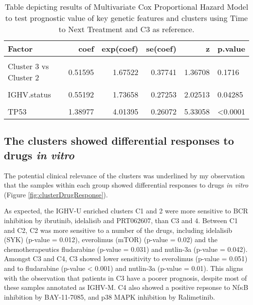 \documentclass[11pt, a4paper, twosided]{book}
\begin{document}
\begin{table}

\caption{\label{tab:clusterCox}Table depicting results of Multivariate Cox Proportional Hazard Model to test prognostic value of key genetic features and clusters using Time to Next Treatment and C3 as reference. }
\centering
\begin{tabular}[t]{l|r|r|r|r|l}
\hline
Factor & coef & exp(coef) & se(coef) & z & p.value\\
\hline
\cellcolor[HTML]{E2E868}{Cluster 3 vs Cluster 1} & \cellcolor[HTML]{E2E868}{-0.03979} & \cellcolor[HTML]{E2E868}{0.96099} & \cellcolor[HTML]{E2E868}{0.29813} & \cellcolor[HTML]{E2E868}{-0.13347} & \cellcolor[HTML]{E2E868}{0.89382}\\
\hline
Cluster 3 vs Cluster 2 & 0.51595 & 1.67522 & 0.37741 & 1.36708 & 0.1716\\
\hline
\cellcolor[HTML]{E2E868}{Cluster 3 vs Cluster 4} & \cellcolor[HTML]{E2E868}{-0.82011} & \cellcolor[HTML]{E2E868}{0.44038} & \cellcolor[HTML]{E2E868}{0.39760} & \cellcolor[HTML]{E2E868}{-2.06267} & \cellcolor[HTML]{E2E868}{0.03914}\\
\hline
IGHV.status & 0.55192 & 1.73658 & 0.27253 & 2.02513 & 0.04285\\
\hline
\cellcolor[HTML]{E2E868}{trisomy 12} & \cellcolor[HTML]{E2E868}{-0.13357} & \cellcolor[HTML]{E2E868}{0.87496} & \cellcolor[HTML]{E2E868}{0.35617} & \cellcolor[HTML]{E2E868}{-0.37503} & \cellcolor[HTML]{E2E868}{0.70764}\\
\hline
TP53 & 1.38977 & 4.01395 & 0.26072 & 5.33058 & <0.0001\\
\hline
\end{tabular}
\end{table}
\hypertarget{the-clusters-showed-differential-responses-to-drugs-in-vitro}{%
\subsection{\texorpdfstring{The clusters showed differential responses to drugs \emph{in vitro}}{The clusters showed differential responses to drugs in vitro}}\label{the-clusters-showed-differential-responses-to-drugs-in-vitro}}

The potential clinical relevance of the clusters was underlined by my observation that the samples within each group showed differential responses to drugs \emph{in vitro} (Figure \ref{fig:clusterDrugResponse}).

As expected, the IGHV-U enriched clusters C1 and 2 were more sensitive to BCR inhibition by ibrutinib, idelalisib and PRT062607, than C3 and 4. Between C1 and C2, C2 was more sensitive to a number of the drugs, including idelalisib (SYK) (p-value = 0.012), everolimus (mTOR) (p-value = 0.02) and the chemotherapeutics fludarabine (p-value = 0.031) and nutlin-3a (p-value = 0.042). Amongst C3 and C4, C3 showed lower sensitivity to everolimus (p-value = 0.051) and to fludarabine (p-value \textless{} 0.001) and nutlin-3a (p-value = 0.01). This aligns with the observation that patients in C3 have a poorer prognosis, despite most of these samples annotated as IGHV-M. C4 also showed a positive repsonse to Nf\(\kappa\)B inhibition by BAY-11-7085, and p38 MAPK inhibition by Ralimetinib.
\end{document}
